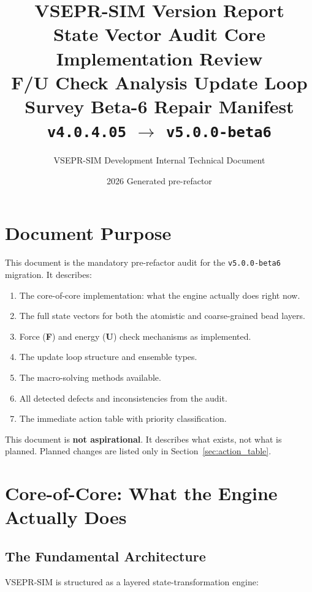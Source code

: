 \documentclass[11pt,a4paper]{article}
\title{
  \textbf{VSEPR-SIM Version Report}\\[0.5em]
  \large State Vector Audit \textemdash{} Core Implementation Review\\
  \large F/U Check Analysis \textemdash{} Update Loop Survey \textemdash{} Beta-6 Repair Manifest\\[1em]
  \normalsize \texttt{v4.0.4.05} $\longrightarrow$ \texttt{v5.0.0-beta6}
}
\author{VSEPR-SIM Development \textemdash{} Internal Technical Document}
\date{2026 \textemdash{} Generated pre-refactor}
\begin{document}
\maketitle
\tableofcontents
\newpage

\section{Document Purpose}

This document is the mandatory pre-refactor audit for the \texttt{v5.0.0-beta6} migration.
It describes:

\begin{enumerate}
  \item The core-of-core implementation: what the engine actually does right now.
  \item The full state vectors for both the atomistic and coarse-grained bead layers.
  \item Force (\textbf{F}) and energy (\textbf{U}) check mechanisms as implemented.
  \item The update loop structure and ensemble types.
  \item The macro-solving methods available.
  \item All detected defects and inconsistencies from the audit.
  \item The immediate action table with priority classification.
\end{enumerate}

This document is \textbf{not aspirational}. It describes what exists, not what is planned.
Planned changes are listed only in Section~\ref{sec:action_table}.

\section{Core-of-Core: What the Engine Actually Does}

\subsection{The Fundamental Architecture}

VSEPR-SIM is structured as a layered state-transformation engine:
\end{document}
